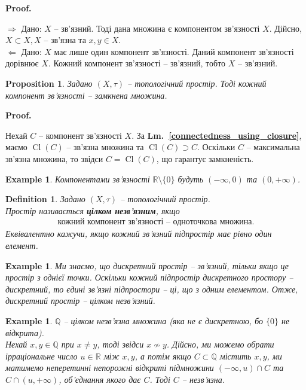 \documentclass[a4paper, 10pt]{article}
\makeatletter
\def\rightproof{$\boxed{\Rightarrow}$ }
\def\leftproof{$\boxed{\Leftarrow}$ }
\theoremstyle{theoremdd}
\newtheorem{definition}[theorem]{Definition}
\newtheorem{example}[theorem]{Example}
\newtheorem{proposition}[theorem]{Proposition}
\newcommand\lmref[1]{\textbf{Lm.~\ref{#1}}}
\DeclareMathOperator{\Cl}{Cl}
\renewenvironment{proof}[1][Proof.\\]{\par
\pushQED{\hfill \qed}%
\normalfont \topsep6\p@\@plus6\p@\relax
\trivlist
\item\relax
{\bfseries
#1\@addpunct{.}}\hspace\labelsep\ignorespaces
}{%
\popQED\endtrivlist\@endpefalse
}
\makeatother
\begin{document}
\begin{proof}
\rightproof Дано: $X$ -- зв'язний. Тоді дана множина є компонентом зв'язності $X$. Дійсно, $X \subset X, X$ -- зв'язна та $x,y \in X$.
\bigskip \\
\leftproof Дано: $X$ має лише один компонент зв'язності. Даний компонент зв'язності дорівнює $X$. Кожний компонент зв'язності -- зв'язний, тобто $X$ -- зв'язний.
\end{proof}

\begin{proposition}
Задано $(X,\tau)$ -- топологічний простір. Тоді кожний компонент зв'язності -- замкнена множина.
\end{proposition}

\begin{proof}
Нехай $C$ -- компонент зв'язності $X$. За \lmref{connectedness_using_closure}, маємо $\Cl(C)$ -- зв'язна множина та $\Cl(C) \supset C$. Оскільки $C$ -- максимальна зв'язна множина, то звідси $C = \Cl(C)$, що гарантує замкненість.
\end{proof}

\begin{example}
Компонентами зв'язності $\mathbb{R} \setminus \{0\}$ будуть $(-\infty,0)$ та $(0,+\infty)$.
\end{example}

\begin{definition}
Задано $(X,\tau)$ -- топологічний простір.\\
Простір називається \textbf{цілком незв'язним}, якщо
\begin{align*}
\text{кожний компонент зв'язності -- одноточкова множина.}
\end{align*}
Еквівалентно кажучи, якщо кожний зв'язний підпростір має рівно один елемент.
\end{definition}

\begin{example}
Ми знаємо, що дискретний простір -- зв'язний, тільки якщо це простір з однієї точки. Оскільки кожний підпростір дискретного простору -- дискретний, то єдині зв'язні підпростори -- ці, що з одним елементом. Отже, дискретний простір -- цілком незв'язний.
\end{example}

\begin{example}
$\mathbb{Q}$ -- цілком незв'язна множина (яка не є дискретною, бо $\{0\}$ не відкрита).\\
Нехай $x,y \in \mathbb{Q}$ при $x \neq y$, тоді звідси $x \not\sim y$. Дійсно, ми можемо обрати ірраціональне число $u \in \mathbb{R}$ між $x,y$, а потім якщо $C \subset \mathbb{Q}$ містить $x,y$, ми матимемо неперетинні непорожні відкриті підмножини $(-\infty,u) \cap C$ та $C \cap (u,+\infty)$, об'єднання якого дає $C$. Тоді $C$ -- незв'язна.
\end{example}
\end{document}
